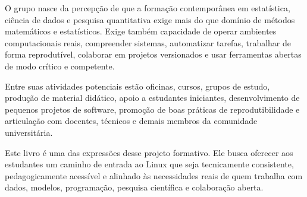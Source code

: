 \documentclass[12pt,openany]{book}
\begin{document}
O grupo nasce da percepção de que a formação contemporânea em estatística, ciência de dados e pesquisa quantitativa exige mais do que domínio de métodos matemáticos e estatísticos. Exige também capacidade de operar ambientes computacionais reais, compreender sistemas, automatizar tarefas, trabalhar de forma reprodutível, colaborar em projetos versionados e usar ferramentas abertas de modo crítico e competente.

Entre suas atividades potenciais estão oficinas, cursos, grupos de estudo, produção de material didático, apoio a estudantes iniciantes, desenvolvimento de pequenos projetos de software, promoção de boas práticas de reprodutibilidade e articulação com docentes, técnicos e demais membros da comunidade universitária.

Este livro é uma das expressões desse projeto formativo. Ele busca oferecer aos estudantes um caminho de entrada ao Linux que seja tecnicamente consistente, pedagogicamente acessível e alinhado às necessidades reais de quem trabalha com dados, modelos, programação, pesquisa científica e colaboração aberta.

\end{document}
